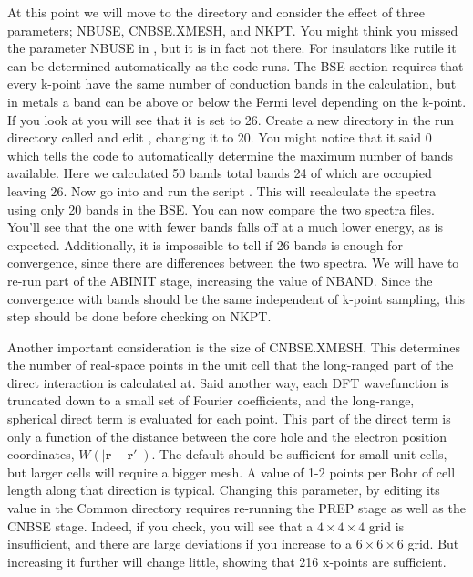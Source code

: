 \documentclass[11pt]{report}
\begin{document}
At this point we will move to the  directory and consider the effect of three parameters; NBUSE, CNBSE.XMESH, and NKPT. You might think you missed the parameter NBUSE in , but it is in fact not there. For insulators like rutile it can be determined automatically as the code runs. The BSE section requires that every k-point have the same number of conduction bands in the calculation, but in metals a band can be above or below the Fermi level depending on the k-point. If you look at  you will see that it is set to 26. Create a new directory in the run directory called  and edit , changing it to 20. You might notice that it said 0 which tells the code to automatically determine the maximum number of bands available. Here we calculated 50 bands total bands 24 of which are occupied leaving 26. Now go into  and run the script . This will recalculate the spectra using only 20 bands in the BSE. You can now compare the two spectra files. You'll see that the one with fewer bands falls off at a much lower energy, as is expected. Additionally, it is impossible to tell if 26 bands is enough for convergence, since there are differences between the two spectra. We will have to re-run part of the ABINIT stage, increasing the value of NBAND. Since the convergence with bands should be the same independent of k-point sampling, this step should be done before checking on NKPT.

Another important consideration is the size of CNBSE.XMESH. This determines the number of real-space points in the unit cell that the long-ranged part of the direct interaction is calculated at. Said another way, each DFT wavefunction is truncated down to a small set of Fourier coefficients, and the long-range, spherical direct term is evaluated for each point. This part of the direct term is only a function of the distance between the core hole and the electron position coordinates, $W(|\mathbf{r-r'}|)$. The default should be sufficient for small unit cells, but larger cells will require a bigger mesh. A value of 1-2 points per Bohr of cell length along that direction is typical. 
Changing this parameter, by editing its value in the Common directory requires re-running the PREP stage as well as the CNBSE stage. 
Indeed, if you check, you will see that a $4\times4\times4$ grid is insufficient, and there are large deviations if you increase to a $6\times6\times6$ grid. But increasing it further will change little, showing that 216 x-points are sufficient. 
\end{document}
